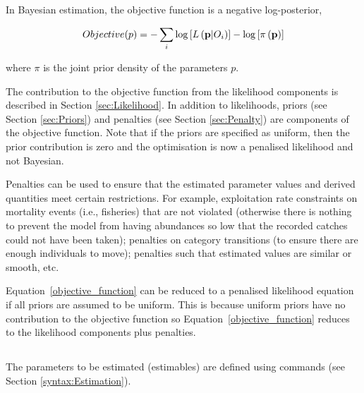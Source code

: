 \subsection{\label{sec:objective-function}}

In Bayesian estimation, the objective function is a negative log-posterior,

\begin{equation}\label{objective_function}
Objective(p)= - \sum\limits_i {\log \left[ {L\left( {{\bf{p}}|O_i } \right)} \right]}  - \log \left[ {\pi \left( {\bf{p}} \right)} \right]
\end{equation}

where $\pi$ is the joint prior density of the parameters $p$.

The contribution to the objective function from the likelihood components is described in Section \ref{sec:Likelihood}. In addition to likelihoods, priors (see Section \ref{sec:Priors}) and penalties (see Section \ref{sec:Penalty}) are components of the objective function. Note that if the priors are specified as uniform, then the prior contribution is zero and the optimisation is now a penalised likelihood and not Bayesian.

Penalties can be used to ensure that the estimated parameter values and derived quantities meet certain restrictions. For example, exploitation rate constraints on mortality events (i.e., fisheries) that are not violated (otherwise there is nothing to prevent the model from having abundances so low that the recorded catches could not have been taken); penalties on category transitions (to ensure there are enough individuals to move); penalties such that estimated values are similar or smooth, etc.

Equation~\ref{objective_function} can be reduced to a penalised likelihood equation if all priors are assumed to be uniform. This is because uniform priors have no contribution to the objective function so Equation~\ref{objective_function} reduces to the likelihood components plus penalties.

\subsection{\label{sec:FreeParameters}}

The parameters to be estimated (estimables) are defined using  commands (see Section \ref{syntax:Estimation}).

